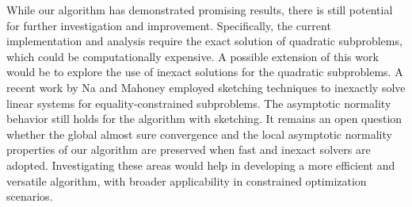 \documentclass[aos]{imsart}
\numberwithin{equation}{section}
\theoremstyle{plain}
\begin{document}
While our algorithm has demonstrated promising results, there is still potential for further investigation and improvement. Specifically, the current implementation and analysis require the exact solution of quadratic subproblems, which could be computationally expensive. A possible extension of this work would be to explore the use of inexact solutions for the quadratic subproblems. A recent work by Na and Mahoney \cite{na2022asymptotic} employed sketching techniques to inexactly solve linear systems for equality-constrained subproblems. The asymptotic normality behavior still holds for the algorithm with sketching. It remains an open question whether the global almost sure convergence and the local asymptotic normality properties of our algorithm are preserved when fast and inexact solvers are adopted. 
Investigating these areas would help in developing a more efficient and versatile algorithm, with broader applicability in constrained optimization scenarios.


\end{document}
